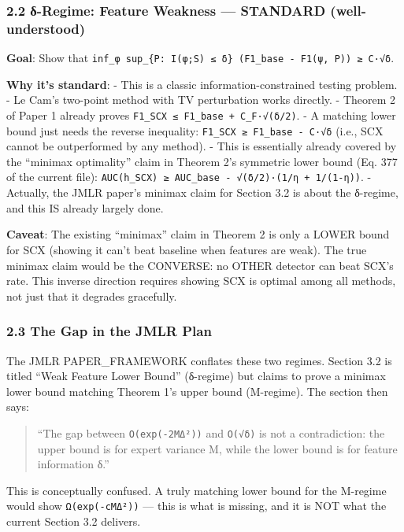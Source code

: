 \documentclass[
  12pt,
]{ctexart}
\begin{document}
\subsubsection{2.2 δ-Regime: Feature Weakness --- STANDARD
(well-understood)}\label{ux3b4-regime-feature-weakness-standard-well-understood}

\textbf{Goal}: Show that
\texttt{inf\_φ\ sup\_\{P:\ I(φ;S)\ ≤\ δ\}\ (F1\_base\ -\ F1(ψ,\ P))\ ≥\ C·√δ}.

\textbf{Why it's standard}: - This is a classic information-constrained
testing problem. - Le Cam's two-point method with TV perturbation works
directly. - Theorem 2 of Paper 1 already proves
\texttt{F1\_SCX\ ≤\ F1\_base\ +\ C\_F·√(δ/2)}. - A matching lower bound
just needs the reverse inequality:
\texttt{F1\_SCX\ ≥\ F1\_base\ -\ C·√δ} (i.e., SCX cannot be outperformed
by any method). - This is essentially already covered by the ``minimax
optimality'' claim in Theorem 2's symmetric lower bound (Eq. 377 of the
current file):
\texttt{AUC(h\_SCX)\ ≥\ AUC\_base\ -\ √(δ/2)·(1/η\ +\ 1/(1-η))}. -
Actually, the JMLR paper's minimax claim for Section 3.2 is about the
δ-regime, and this IS already largely done.

\textbf{Caveat}: The existing ``minimax'' claim in Theorem 2 is only a
LOWER bound for SCX (showing it can't beat baseline when features are
weak). The true minimax claim would be the CONVERSE: no OTHER detector
can beat SCX's rate. This inverse direction requires showing SCX is
optimal among all methods, not just that it degrades gracefully.

\subsubsection{2.3 The Gap in the JMLR
Plan}\label{the-gap-in-the-jmlr-plan}

The JMLR PAPER\_FRAMEWORK conflates these two regimes. Section 3.2 is
titled ``Weak Feature Lower Bound'' (δ-regime) but claims to prove a
minimax lower bound matching Theorem 1's upper bound (M-regime). The
section then says:

\begin{quote}
``The gap between \texttt{O(exp(-2MΔ²))} and \texttt{O(√δ)} is not a
contradiction: the upper bound is for expert variance M, while the lower
bound is for feature information δ.''
\end{quote}

This is conceptually confused. A truly matching lower bound for the
M-regime would show \texttt{Ω(exp(-cMΔ²))} --- this is what is missing,
and it is NOT what the current Section 3.2 delivers.
\end{document}
